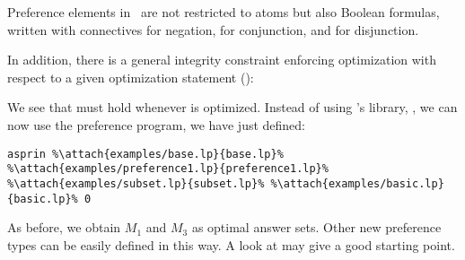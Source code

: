 \begin{note}
Preference elements in \asprin\ are not restricted to atoms 
but also Boolean formulas, written with connectives 
\code{\~} for negation, 
\code{\&} for conjunction,
and 
\code{|} for disjunction.
\end{note}

In addition, 
there is a general integrity constraint enforcing optimization with respect to a given optimization statement
():
%

%
We see that  must hold whenever  is optimized. 
Instead of using \asprin's library, , 
we can now use the preference program, we have just defined:
\begin{lstlisting}[numbers=none,escapechar=\%]
asprin %\attach{examples/base.lp}{base.lp}% %\attach{examples/preference1.lp}{preference1.lp}% %\attach{examples/subset.lp}{subset.lp}% %\attach{examples/basic.lp}{basic.lp}% 0
\end{lstlisting}
As before, we obtain $M_1$ and $M_3$ as optimal answer sets.
Other new preference types can be easily defined in this way.  
A look at  may give a good starting point. 

